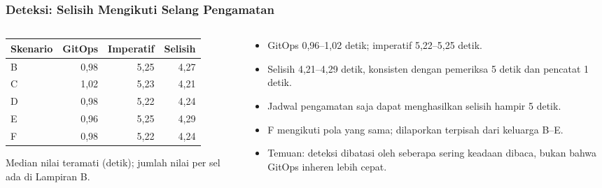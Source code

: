 {
\usebackgroundtemplate{\backgroundcontent}
\begin{frame}
    \frametitle{Deteksi: Selisih Mengikuti Selang Pengamatan}
    \begin{columns}[T]
        \begin{column}{0.48\textwidth}
            \centering
            \scriptsize
            \begin{tabular}{@{}lrrr@{}}
                \toprule
                \textbf{Skenario} & \textbf{GitOps} & \textbf{Imperatif} & \textbf{Selisih} \\
                \midrule
                B & 0,98 & 5,25 & 4,27 \\
                C & 1,02 & 5,23 & 4,21 \\
                D & 0,98 & 5,22 & 4,24 \\
                E & 0,96 & 5,25 & 4,29 \\
                F & 0,98 & 5,22 & 4,24 \\
                \bottomrule
            \end{tabular}
            \par\vspace{0.08cm}
            \raggedleft Median nilai teramati (detik); jumlah nilai per sel ada di Lampiran B.
        \end{column}
        \begin{column}{0.48\textwidth}
            \scriptsize
            \begin{itemize}\setlength{\itemsep}{4pt}
                \item GitOps 0,96--1,02 detik; imperatif 5,22--5,25 detik.
                \item Selisih 4,21--4,29 detik, konsisten dengan pemeriksa 5 detik dan pencatat 1 detik.
                \item Jadwal pengamatan saja dapat menghasilkan selisih hampir 5 detik.
                \item F mengikuti pola yang sama; dilaporkan terpisah dari keluarga B--E.
                \item Temuan: deteksi dibatasi oleh seberapa sering keadaan dibaca, bukan bahwa GitOps inheren lebih cepat.
            \end{itemize}
        \end{column}
    \end{columns}
    \vspace{0.06cm}
\end{frame}
}

